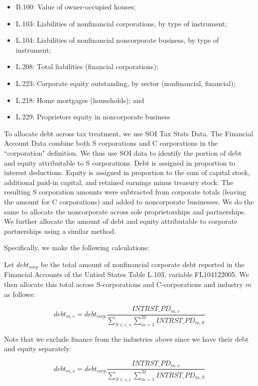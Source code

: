 \documentclass[article,11pt,letterpaper,fleqn]{article}
\theoremstyle{definition}
\numberwithin{equation}{section}
\begin{document}
\begin{itemize}
\item B.100: Value of owner-occupied houses;
\item L.103: Liabilities of nonfinancial corporations, by type of instrument;
\item L.104: Liabilities of nonfinancial noncorporate business, by type of instrument;
\item L.208: Total liabilities (financial corporations);
\item L.223: Corporate equity outstanding, by sector (nonfinancial, financial);
\item L.218: Home mortgages (households); and
\item L.229: Proprietors equity in noncorporate business
\end{itemize}

To allocate debt across tax treatment, we use SOI Tax Stats Data.  The Financial Account Data combine both S corporations and C corporations in the ``corporation" definition.  We thus use SOI data to identify the portion of debt and equity attributable to S corporations. Debt is assigned in proportion to interest deductions. Equity is assigned in proportion to the sum of capital stock, additional paid-in capital, and retained earnings minus treasury stock. The resulting S corporation amounts were subtracted from corporate totals (leaving the amount for C corporations) and added to noncorporate businesses.  We do the same to allocate the noncorporate across sole proprietorships and partnerships.  We further allocate the amount of debt and equity attributable to corporate partnerships using a similar method.

Specifically, we make the following calculations:  

Let $debt_{corp}$ be the total amount of nonfinancial corporate debt reported in the Financial Accounts of the Untied States Table L.103, variable FL104122005.  We then allocate this total across S-corporations and C-corporations and industry $m$ as follows:

\begin{equation}
debt_{m,c} = debt_{corp}\frac{INTRST\_PD_{m,c}}{\sum_{S\in{c,s}}\sum_{m=1}^{M}INTRST\_PD_{m,S}}
\end{equation}

Note that we exclude finance from the industries above since we have their debt and equity separately.

\begin{equation}
debt_{m,s} = debt_{corp}\frac{INTRST\_PD_{m,s}}{\sum_{S\in{s,c}}\sum_{m=1}^{M}INTRST\_PD_{m,S}}
\end{equation}
\end{document}
